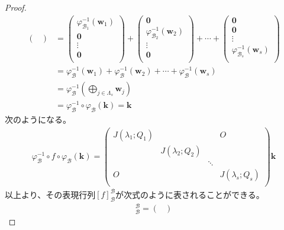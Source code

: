 \documentclass[dvipdfmx]{jsarticle}
\begin{document}
\begin{proof}
\begin{align*}
\begin{pmatrix}
\end{pmatrix} &= \begin{pmatrix}
\varphi_{\mathcal{B}_{1}}^{- 1}\left( \mathbf{w}_{1} \right) \\
\mathbf{0} \\
 \vdots \\
\mathbf{0} \\
\end{pmatrix} + \begin{pmatrix}
\mathbf{0} \\
\varphi_{\mathcal{B}_{2}}^{- 1}\left( \mathbf{w}_{2} \right) \\
 \vdots \\
\mathbf{0} \\
\end{pmatrix} + \cdots + \begin{pmatrix}
\mathbf{0} \\
\mathbf{0} \\
 \vdots \\
\varphi_{\mathcal{B}_{s}}^{- 1}\left( \mathbf{w}_{s} \right) \\
\end{pmatrix}\\
&= \varphi_{\mathcal{B}}^{- 1}\left( \mathbf{w}_{1} \right) + \varphi_{\mathcal{B}}^{- 1}\left( \mathbf{w}_{2} \right) + \cdots + \varphi_{\mathcal{B}}^{- 1}\left( \mathbf{w}_{s} \right)\\
&= \varphi_{\mathcal{B}}^{- 1}\left( \bigoplus_{j \in \varLambda_{s}} \mathbf{w}_{j} \right)\\
&= \varphi_{\mathcal{B}}^{- 1} \circ \varphi_{\mathcal{B}}\left( \mathbf{k} \right) = \mathbf{k}
\end{align*}
次のようになる。
\begin{align*}
\varphi_{\mathcal{B}}^{- 1} \circ f \circ \varphi_{\mathcal{B}}\left( \mathbf{k} \right) = \begin{pmatrix}
J\left( \lambda_{1};Q_{1} \right) & \  & \  & O \\
\  & J\left( \lambda_{2};Q_{2} \right) & \  & \  \\
\  & \  & \ddots & \  \\
O & \  & \  & J\left( \lambda_{s};Q_{s} \right) \\
\end{pmatrix}\mathbf{k}
\end{align*}
以上より、その表現行列$[ f]_{\mathcal{B}}^{\mathcal{B}}$が次式のように表されることができる。
\begin{align*}
[ f]_{\mathcal{B}}^{\mathcal{B}} = \begin{pmatrix}

\end{pmatrix}
\end{align*}
\end{proof}
\end{document}

